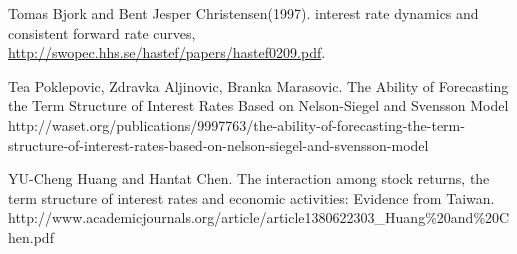 \documentclass{article}
\begin{document}
\begin{thebibliography}{99}
 Tomas Bjork and Bent Jesper Christensen(1997).
 \newblock interest rate dynamics and consistent forward rate curves,
 \newblock \url {http://swopec.hhs.se/hastef/papers/hastef0209.pdf}.

\bibitem{} Tea Poklepovic, Zdravka Aljinovic, Branka Marasovic.
 \newblock The Ability of Forecasting the Term Structure of Interest Rates Based on Nelson-Siegel and Svensson Model
 \newblock http://waset.org/publications/9997763/the-ability-of-forecasting-the-term-structure-of-interest-rates-based-on-nelson-siegel-and-svensson-model
 
\bibitem{} YU-Cheng Huang and Hantat Chen.
 \newblock The interaction among stock returns, the term structure of interest rates and economic activities: Evidence from Taiwan.
 \newblock http://www.academicjournals.org/article/article1380622303_Huang\%20and\%20Chen.pdf
  
 \end{thebibliography}
\end{document}
